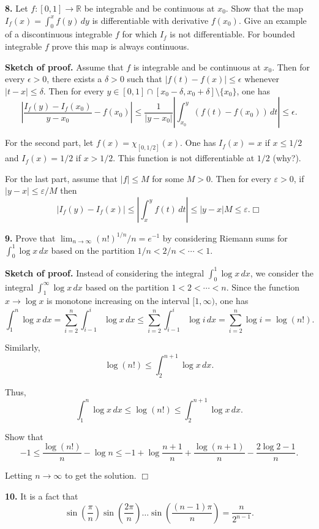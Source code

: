 \documentclass{article}
\begin{document}
    \textbf{8.} Let $f : [0, 1] → \mathbb{R}$ be integrable and be
continuous at $x_0$. Show that the map $I_f (x) = \int_0^x f (y)\, dy$
is differentiable with derivative $f (x_0 )$. Give an example of a
discontinuous integrable $f$ for which $I_f$ is not differentiable. For
bounded integrable $f$ prove this map is always continuous.

    \textbf{Sketch of proof.} Assume that $f$ is integrable and be
continuous at $x_0$. Then for every $\epsilon>0$, there exists a
$\delta>0$ such that $|f(t)-f(x)|\le \epsilon$ whenever
$|t-x|\le \delta$. Then for every
$y\in [0, 1]\cap [x_0-\delta, x_0+\delta]\setminus \{x_0\}$, one has
\[\left|\frac{I_f(y) - I_f(x_0)}{y-x_0}-f(x_0)\right| \le \frac{1}{|y-x_0|}\left|\int_{x_0}^{y} (f(t) - f(x_0))\,dt\right|\le \epsilon.\]

For the second part, let $f(x)  = \chi_{[0, 1/2]}(x)$. One has
$I_f(x) = x$ if $x \le 1/2$ and $I_f(x) = 1/2$ if $x > 1/2$. This
function is not differentiable at $1/2$ (why?).

For the last part, assume that $|f|\le M$ for some $M > 0$. Then for
every $\varepsilon>0$, if $|y-x|\le \varepsilon / M$ then
\[|I_f(y) - I_f(x)|\le \left|\int_{x}^y  f(t)\, dt \right| \le |y-x|M \le \varepsilon. \Box\]

    \textbf{9.} Prove that $\lim_{n\to\infty} (n!)^{1/n}/n = e^{−1}$ by
considering Riemann sums for $\int_0^1 \log x\,dx$ based on the
partition $1/n < 2/n < \cdots < 1$.

    \textbf{Sketch of proof.} Instead of considering the integral
$\int_0^1 \log x \, dx$, we consider the integral
$\int_1^{\infty} \log x \,dx$ based on the partition
$1 < 2 < \cdots < n$. Since the function $x\to \log x$ is monotone
increasing on the interval $[1, \infty)$, one has
\[\int_{1}^{n}\log x\,dx = \sum_{i=2}^{n}\int_{i-1}^{i}\log x\, dx \le \sum_{i=2}^{n}\int_{i-1}^{i}\log i\, dx=\sum_{i=2}^{n}\log i = \log(n!).
\]

Similarly, \[\log (n!)\le \int_{2}^{n+1}\log x\,dx.\]

Thus,
\[\int_{1}^{n}\log x\,dx\le \log (n!)\le \int_{2}^{n+1}\log x\,dx.\]

Show that
\[-1\le \frac{\log(n!)}{n}-\log n\le -1 +\log\frac{n+1}{n}+\frac{\log (n+1)}{n}-\frac{2\log 2-1}{n}.\]

Letting $n\to \infty$ to get the solution. $\Box$

    \textbf{10.} It is a fact that
\[\sin\left(\frac{\pi}{n}\right)\sin\left(\frac{2\pi}{n}\right)\ldots \sin\left(\frac{(n-1)\pi}{n}\right) = \frac{n}{2^{n-1}}.\]
\end{document}
